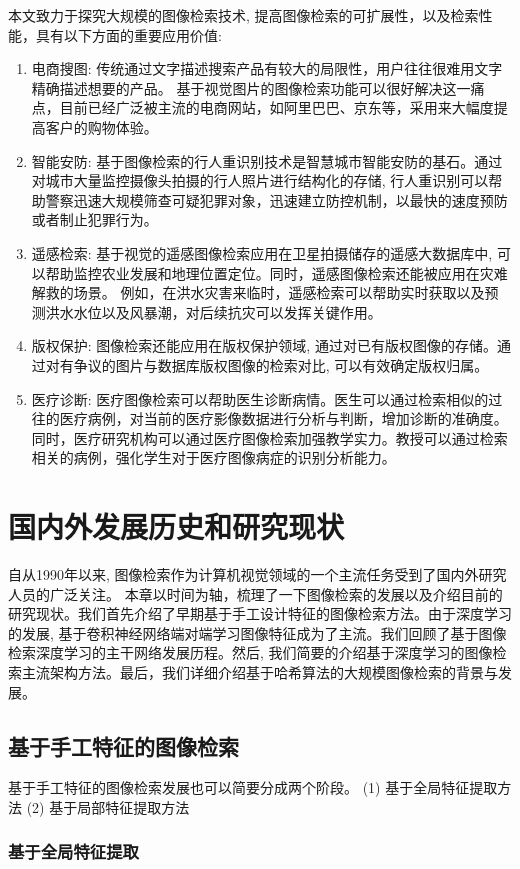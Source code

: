 本文致力于探究大规模的图像检索技术, 提高图像检索的可扩展性，以及检索性能，具有以下方面的重要应用价值:
\begin{enumerate}
    \item 电商搜图: 传统通过文字描述搜索产品有较大的局限性，用户往往很难用文字精确描述想要的产品。 基于视觉图片的图像检索功能可以很好解决这一痛点，目前已经广泛被主流的电商网站，如阿里巴巴、京东等，采用来大幅度提高客户的购物体验。
    \item 智能安防: 基于图像检索的行人重识别技术是智慧城市智能安防的基石。通过对城市大量监控摄像头拍摄的行人照片进行结构化的存储, 行人重识别可以帮助警察迅速大规模筛查可疑犯罪对象，迅速建立防控机制，以最快的速度预防或者制止犯罪行为。 
    \item 遥感检索: 基于视觉的遥感图像检索应用在卫星拍摄储存的遥感大数据库中, 可以帮助监控农业发展和地理位置定位。同时，遥感图像检索还能被应用在灾难解救的场景。 例如，在洪水灾害来临时，遥感检索可以帮助实时获取以及预测洪水水位以及风暴潮，对后续抗灾可以发挥关键作用。
    \item 版权保护: 图像检索还能应用在版权保护领域, 通过对已有版权图像的存储。通过对有争议的图片与数据库版权图像的检索对比, 可以有效确定版权归属。
    \item 医疗诊断: 医疗图像检索可以帮助医生诊断病情。医生可以通过检索相似的过往的医疗病例，对当前的医疗影像数据进行分析与判断，增加诊断的准确度。同时，医疗研究机构可以通过医疗图像检索加强教学实力。教授可以通过检索相关的病例，强化学生对于医疗图像病症的识别分析能力。
\end{enumerate}

\section{国内外发展历史和研究现状}
自从1990年以来, 图像检索作为计算机视觉领域的一个主流任务受到了国内外研究人员的广泛关注。 本章以时间为轴，梳理了一下图像检索的发展以及介绍目前的研究现状。我们首先介绍了早期基于手工设计特征的图像检索方法。由于深度学习的发展, 基于卷积神经网络端对端学习图像特征成为了主流。我们回顾了基于图像检索深度学习的主干网络发展历程。然后, 我们简要的介绍基于深度学习的图像检索主流架构方法。最后，我们详细介绍基于哈希算法的大规模图像检索的背景与发展。
\subsection{基于手工特征的图像检索}
\label{sec:manual}
基于手工特征的图像检索发展也可以简要分成两个阶段。 (1) 基于全局特征提取方法 (2) 基于局部特征提取方法
\subsubsection{基于全局特征提取}

